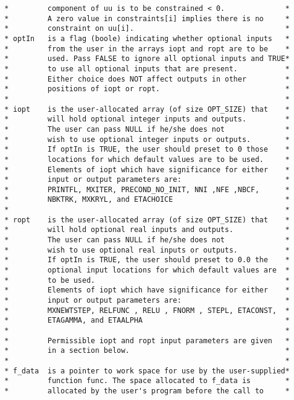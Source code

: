 \documentclass[11pt]{article}
\begin{document}
\begin{verbatim}
 *         component of uu is to be constrained < 0.              *
 *         A zero value in constraints[i] implies there is no     *
 *         constraint on uu[i].                                   *
 * optIn   is a flag (boole) indicating whether optional inputs   *
 *         from the user in the arrays iopt and ropt are to be    *
 *         used. Pass FALSE to ignore all optional inputs and TRUE*
 *         to use all optional inputs that are present.           *
 *         Either choice does NOT affect outputs in other         *
 *         positions of iopt or ropt.                             *
 *                                                                *
 * iopt    is the user-allocated array (of size OPT_SIZE) that    *
 *         will hold optional integer inputs and outputs.         *
 *         The user can pass NULL if he/she does not              *
 *         wish to use optional integer inputs or outputs.        *
 *         If optIn is TRUE, the user should preset to 0 those    *
 *         locations for which default values are to be used.     *
 *         Elements of iopt which have significance for either    *
 *         input or output parameters are:                        *
 *         PRINTFL, MXITER, PRECOND_NO_INIT, NNI ,NFE ,NBCF,      *
 *         NBKTRK, MXKRYL, and ETACHOICE                          *
 *                                                                *
 * ropt    is the user-allocated array (of size OPT_SIZE) that    *
 *         will hold optional real inputs and outputs.            *
 *         The user can pass NULL if he/she does not              *
 *         wish to use optional real inputs or outputs.           *
 *         If optIn is TRUE, the user should preset to 0.0 the    *
 *         optional input locations for which default values are  *
 *         to be used.                                            *
 *         Elements of iopt which have significance for either    *
 *         input or output parameters are:                        *
 *         MXNEWTSTEP, RELFUNC , RELU , FNORM , STEPL, ETACONST,  *
 *         ETAGAMMA, and ETAALPHA                                 * 
 *                                                                *
 *         Permissible iopt and ropt input parameters are given   *
 *         in a section below.                                    *
 *                                                                *
 * f_data  is a pointer to work space for use by the user-supplied*
 *         function func. The space allocated to f_data is        *
 *         allocated by the user's program before the call to     *

\end{verbatim}
\end{document}
